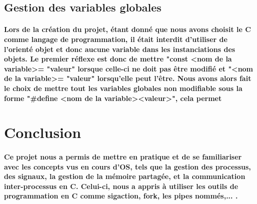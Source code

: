 \documentclass[utf8]{article}
\begin{document}
\subsection{Gestion des variables globales}
\paragraph{Lors de la création du projet, étant donné que nous avons choisit le C comme langage de programmation, il était interdit 
d'utiliser de l'orienté objet et donc aucune variable dans les instanciations des objets. Le premier réflexe est donc de mettre
"const \textless nom de la variable\textgreater  = "valeur" lorsque celle-ci ne doit pas être modifié et "\textless nom de la variable\textgreater = "valeur" lorsqu'elle 
peut l'être. Nous avons alors fait le choix de mettre tout les variables globales non modifiable sous la forme 
"\#define \textless nom de la variable\textgreater \textless valeur\textgreater", cela permet }

\section{Conclusion}
\paragraph{Ce projet nous a permis de mettre en pratique et de se familiariser avec les concepts vus en cours d'OS,
tels que la gestion des processus, des signaux, la gestion de la mémoire partagée, et la communication inter-processus en C.
Celui-ci, nous a appris à utiliser les outils de programmation en C comme sigaction, fork, les pipes nommés,... .
}
\end{document}
